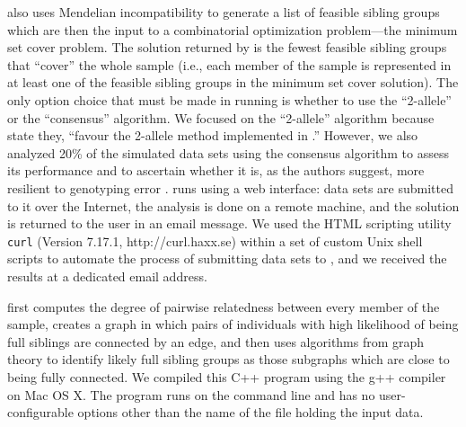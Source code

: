 \documentclass[11pt]{article}
\begin{document}
\kinalyzer{} also uses Mendelian incompatibility to generate a list of feasible sibling groups which 
are then the input to a combinatorial optimization problem---the minimum set cover problem.  The 
solution returned by \kinalyzer{} is the fewest feasible sibling groups that ``cover'' the whole sample 
(i.e., each member of the sample is represented in at least one of the feasible sibling groups in the 
minimum set cover solution). The only option choice that must be made in running \kinalyzer{} is 
whether to use the ``2-allele'' or the ``consensus'' algorithm.  We focused on the ``2-allele'' 
algorithm because \citet{ashley09} state they, ``favour the 2-allele method implemented in 
\kinalyzer{}.''  However, we also analyzed 20\% of the simulated data sets using the consensus 
algorithm \citep{sheik08} to assess its performance and to ascertain whether it is, as the authors 
suggest, more resilient to genotyping error \citep{sheik08_err_tol}.    \kinalyzer{} runs using a web 
interface: data sets are submitted to it over the Internet, the analysis is done on a remote machine, 
and the solution is returned to the user in an email message.  We used the HTML scripting utility {\tt 
curl} (Version 7.17.1, http://curl.haxx.se) within a set of custom Unix shell scripts to automate the 
process of submitting data sets to \kinalyzer{}, and we received the results at a dedicated email 
address.     


\familyfinder{} first computes the degree of pairwise relatedness between every member of the sample, 
creates a graph in which pairs of individuals with high likelihood of being full siblings are connected 
by an edge, and then uses algorithms from graph theory to identify likely full sibling groups as those 
subgraphs which are close to being fully connected.  We compiled this C++ program using the g++ 
compiler on Mac OS X.  The program runs on the command line and has no user-configurable options other 
than the name of the file holding the input data.    
\end{document}
